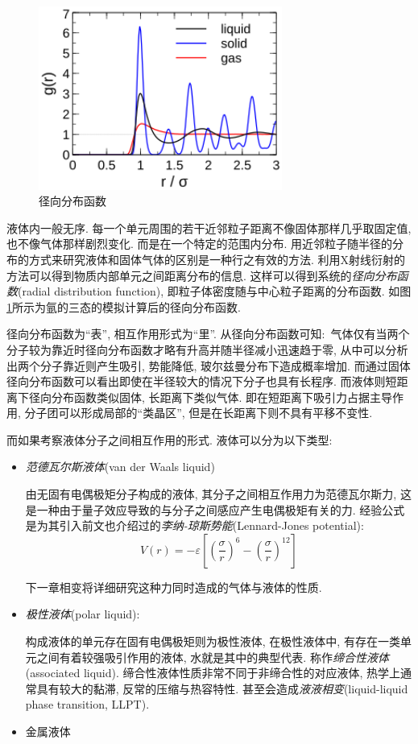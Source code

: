 \begin{figure}
\vspace{-0.4cm}
\centering
\includegraphics[width=8cm]{image/5-3-8.png}
\caption{径向分布函数}\label{fig:rdf}
\end{figure}
液体内一般无序. 每一个单元周围的若干近邻粒子距离不像固体那样几乎取固定值, 也不像气体那样剧烈变化. 而是在一个特定的范围内分布. 用近邻粒子随半径的分布的方式来研究液体和固体气体的区别是一种行之有效的方法. 利用X射线衍射的方法可以得到物质内部单元之间距离分布的信息. 这样可以得到系统的\emph{径向分布函数}(radial distribution function), 即粒子体密度随与中心粒子距离的分布函数. 如图\ref{fig:rdf}所示为氩的三态的模拟计算后的径向分布函数.

径向分布函数为``表'', 相互作用形式为``里''. 从径向分布函数可知:\, 气体仅有当两个分子较为靠近时径向分布函数才略有升高并随半径减小迅速趋于零, 从中可以分析出两个分子靠近则产生吸引, 势能降低, 玻尔兹曼分布下造成概率增加. 而通过固体径向分布函数可以看出即使在半径较大的情况下分子也具有长程序. 而液体则短距离下径向分布函数类似固体, 长距离下类似气体. 即在短距离下吸引力占据主导作用, 分子团可以形成局部的``类晶区'', 但是在长距离下则不具有平移不变性.

而如果考察液体分子之间相互作用的形式. 液体可以分为以下类型:

\begin{itemize}
\item \emph{范德瓦尔斯液体}(van der Waals liquid)

由无固有电偶极矩分子构成的液体, 其分子之间相互作用力为范德瓦尔斯力, 这是一种由于量子效应导致的与分子之间感应产生电偶极矩有关的力. 经验公式是为其引入前文也介绍过的\emph{李纳-琼斯势能}(Lennard-Jones potential):
\[V(r)=-\varepsilon  \left[ \left( \frac{\sigma}{r} \right)^6- \left( \frac{\sigma}{r} \right)^{12}\right]  \]

下一章相变将详细研究这种力同时造成的气体与液体的性质.

\item \emph{极性液体}(polar liquid):

构成液体的单元存在固有电偶极矩则为极性液体, 在极性液体中, 有存在一类单元之间有着较强吸引作用的液体, 水就是其中的典型代表. 称作\emph{缔合性液体}(associated liquid). 缔合性液体性质非常不同于非缔合性的对应液体, 热学上通常具有较大的黏滞, 反常的压缩与热容特性. 甚至会造成\emph{液液相变}(liquid-liquid phase transition, LLPT).

\item 金属液体

\end{itemize}


